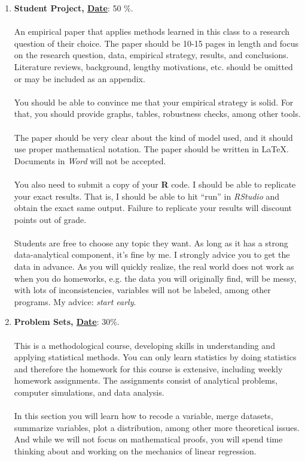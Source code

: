 \documentclass[letterpaper]{article}
\begin{document}
\begin{enumerate}
	\item {\bf Student Project, \underline{Date}}: 50 \%. 
	\\
	\\
	An empirical paper that applies methods learned in this class to a research question of their choice. The paper should be 10-15 pages in length and focus on the research question, data, empirical strategy, results, and conclusions. Literature reviews, background, lengthy motivations, etc. should be omitted or may be included as an appendix. 
	\\
	\\
	You should be able to convince me that your empirical strategy is solid. For that, you should provide graphs, tables, robustness checks, among other tools. 
	\\
	\\
	The paper should be very clear about the kind of model used, and it should use proper mathematical notation. The paper should be written in \LaTeX. Documents in \emph{Word} will not be accepted.
	\\
	\\
	You also need to submit a copy of your {\bf R} code. I should be able to replicate your exact results. That is, I should be able to hit ``run'' in \emph{RStudio} and obtain the exact same output. Failure to replicate your results will discount points out of grade.
	\\
	\\
	Students are free to choose any topic they want. As long as it has a strong data-analytical component, it's fine by me. I strongly advice you to get the data in advance. As you will quickly realize, the real world does not work as when you do homeworks, e.g. the data you will originally find, will be messy, with lots of inconsistencies, variables will not be labeled, among other programs. My advice: \emph{start early}.


	\item {\bf Problem Sets, \underline{Date}}: 30\%. 
	\\
	\\
	This is a methodological course, developing skills in understanding and applying statistical methods. You can only learn statistics by doing statistics and therefore the homework for this course is extensive, including weekly homework assignments. The assignments consist of analytical problems, computer simulations, and data analysis. 
	\\
	\\
	In this section you will learn how to recode a variable, merge datasets, summarize variables, plot a distribution, among other more theoretical issues. And while we will not focus on mathematical proofs, you will spend time thinking about and working on the mechanics of linear regression.



\end{enumerate}
\end{document}
